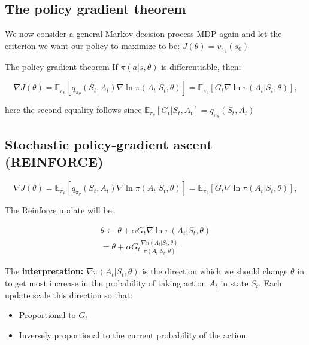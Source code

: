 \subsection{The policy gradient theorem}
We now consider a general Markov decision process MDP again and let the criterion we want our policy to maximize to be: $J(\theta) = v_{\pi_\theta} (s_0)$

\begin{wbox}{The policy gradient theorem}
If $\pi (a|s, \theta)$ is differentiable, then:

	\begin{equation}
		\nabla J(\theta) = \mathbb{E}_{\pi_\theta} [q_{\pi_\theta}(S_t,A_t)\nabla \ln \pi (A_t|S_t, \theta)] = \mathbb{E}_{\pi_\theta} [G_t \nabla \ln \pi (A_t|S_t, \theta)],
	\end{equation}

here the second equality follows since $\mathbb{E}_{\pi_\theta} [G_t |S_t,A_t] = q_{\pi_\theta}(S_t,A_t)$
\end{wbox}


\subsection{Stochastic policy-gradient ascent (REINFORCE)}
	\begin{equation}
		\nabla J(\theta) = \mathbb{E}_{\pi_\theta} [q_{\pi_\theta}(S_t,A_t)\nabla \ln \pi (A_t|S_t, \theta)] = \mathbb{E}_{\pi_\theta} [G_t \nabla \ln \pi (A_t|S_t, \theta)],
	\end{equation}

The Reinforce update will be:

	\begin{equation}
	\begin{aligned}
		\theta \leftarrow \theta + \alpha G_t \nabla \ln \pi (A_t|S_t, \theta) \\
		= \theta + \alpha G_t \frac{\nabla \pi (A_t|S_t, \theta)} {\pi (A_t|S_t, \theta) } 
	\end{aligned}
	\end{equation}

The \textbf{interpretation:} $\nabla \pi (A_t|S_t, \theta)$ is the direction which we should change $\theta$ in to get most increase in the probability of taking action $A_t$ in state $S_t$. Each update scale this direction so that:

	\begin{itemize}
		\item Proportional to $G_t$
		\item Inversely proportional to the current probability of the action.
	\end{itemize}



